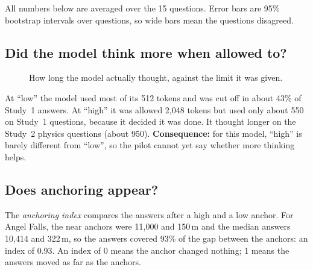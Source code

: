 \documentclass[11pt,a4paper]{article}
\begin{document}
All numbers below are averaged over the 15 questions. Error bars are 95\% bootstrap intervals over questions, so wide bars mean the questions disagreed.

\subsection{Did the model think more when allowed to?}

\begin{figure}[ht]
\centering
{}
\caption{How long the model actually thought, against the limit it was given.}
\label{fig:tokens}
\end{figure}

At \enquote{low} the model used most of its 512 tokens and was cut off in about 43\% of Study~1 answers. At \enquote{high} it was allowed 2,048 tokens but used only about 550 on Study~1 questions, because it decided it was done. It thought longer on the Study~2 physics questions (about 950). \textbf{Consequence:} for this model, \enquote{high} is barely different from \enquote{low}, so the pilot cannot yet say whether more thinking helps.

\subsection{Does anchoring appear?}

The \emph{anchoring index} \citep{jacowitz1995measures} compares the answers after a high and a low anchor. For Angel Falls, the near anchors were 11,000 and 150\,m and the median answers 10,414 and 322\,m, so the answers covered 93\% of the gap between the anchors: an index of 0.93. An index of 0 means the anchor changed nothing; 1 means the answers moved as far as the anchors.
\end{document}
